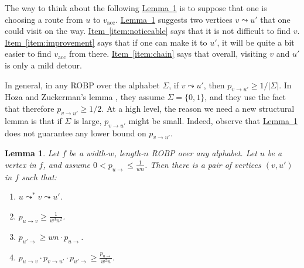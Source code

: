 \documentclass[11pt]{article}
\numberwithin{equation}{section}
\newtheorem{lemma}[theorem]{Lemma}
\theoremstyle{definition}
\theoremstyle{plain}
\newcommand{\expref}[2]{\hyperref[#2]{#1~\ref{#2}}}
\begin{document}
The way to think about the following \expref{Lemma}{lem:structural} is to suppose that one is choosing a route from $u$ to $v_{\text{acc}}$. \expref{Lemma}{lem:structural} suggests two vertices $v \leadsto u'$ that one could visit on the way. \expref{Item}{item:noticeable} says that it is not difficult to find $v$. \expref{Item}{item:improvement} says that if one can make it to $u'$, it will be quite a bit easier to find $v_{\text{acc}}$ from there. \expref{Item}{item:chain} says that overall, visiting $v$ and $u'$ is only a mild detour.

In general, in any ROBP over the alphabet $\Sigma$, if $v \leadsto u'$, then $p_{v \to u'} \geq 1/|\Sigma|$. In Hoza and Zuckerman's lemma \cite[Lemma 1]{HZ20}, they assume $\Sigma = \{0, 1\}$, and they use the fact that therefore $p_{v \to u'} \geq 1/2$. At a high level, the reason we need a new structural lemma is that if $\Sigma$ is large, $p_{v \to u'}$ might be small. Indeed, observe that \expref{Lemma}{lem:structural} does not guarantee any lower bound on $p_{v \to u'}$.

\begin{lemma} \label{lem:structural}
Let $f$ be a width-$w$, length-$n$ ROBP over any alphabet. Let $u$ be a vertex in $f$, and assume $0 < p_{u \to} \leq \frac{1}{wn}$. Then there is a pair of vertices $(v, u')$ in $f$ such that:
\begin{enumerate}
\item $u \leadsto^* v \leadsto u'$. \label{item:preceding}
\item $p_{u \to v} \geq \frac{1}{w^3 n^2}$. \label{item:noticeable}
\item $p_{u' \to} \geq wn \cdot p_{u \to}$. \label{item:improvement}
\item $p_{u \to v} \cdot p_{v \to u'} \cdot p_{u' \to} \geq \frac{p_{u \to}}{w^2 n}$. \label{item:chain}
\end{enumerate}
\end{lemma}
\end{document}
